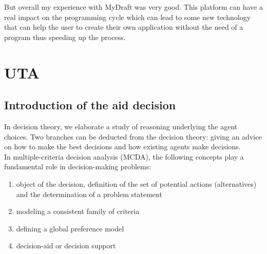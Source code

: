 \documentclass{report}
\begin{document}
But overall my experience with MyDraft was very good. This platform can have a real impact on the programming cycle which can lead to some new technology that can help the user to create their own application without the need of a program thus speeding up the process.

\section{UTA}

\subsection{Introduction of the aid decision}
In decision theory, we elaborate a study of reasoning underlying the agent choices. Two branches can be deducted from the decision theory: giving an advice on how to make the best decisions and how existing agents make decisions. \\
In multiple-criteria decision analysis (MCDA), the following concepts play a fundamental role in decision-making problems: 
\begin{enumerate}
\item object of the decision, definition of the set of potential actions (alternatives) and the determination of a problem statement
\item modeling a consistent family of criteria
\item defining a global preference model
\item decision-aid or decision support
\end{enumerate}
\end{document}
